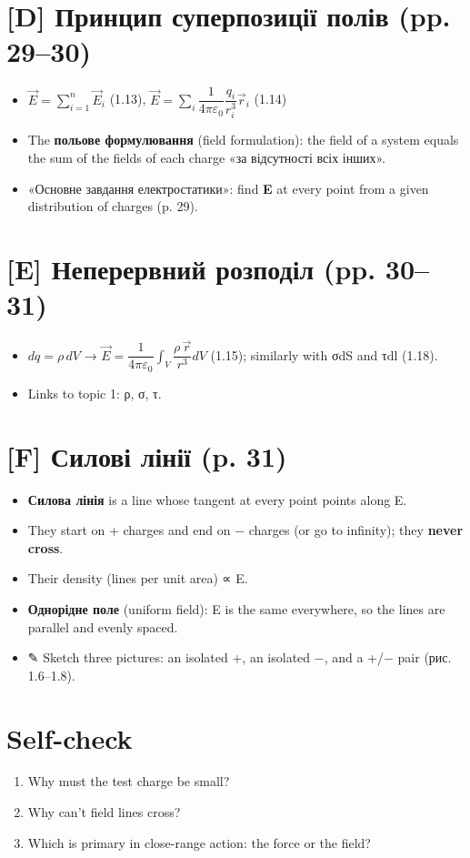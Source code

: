 \documentclass[11pt,a4paper,oneside]{book}
\newcommand{\pen}{{\sffamily\color{accent}✎}}
\begin{document}
\section*{[D] Принцип суперпозиції полів (pp. 29–30)}
\begin{itemize}
\item $\vec E = \sum_{i=1}^n \vec E_i$ (1.13), $\vec E = \sum_i \dfrac{1}{4\pi\varepsilon_0}\dfrac{q_i}{r_i^3}\vec r_i$ (1.14)
\item The \textbf{польове формулювання} (field formulation): the field of a system equals the sum of the fields of each charge «за відсутності всіх інших».
\item «Основне завдання електростатики»: find \textbf{E} at every point from a given distribution of charges (p. 29).
\end{itemize}

\section*{[E] Неперервний розподіл (pp. 30–31)}
\begin{itemize}
\item $dq = \rho\,dV$ → $\vec E = \dfrac{1}{4\pi\varepsilon_0}\int_V \dfrac{\rho\,\vec r}{r^3}dV$ (1.15); similarly with σdS and τdl (1.18).
\item Links to topic 1: ρ, σ, τ.
\end{itemize}

\section*{[F] Силові лінії (p. 31)}
\begin{itemize}
\item \textbf{Силова лінія} is a line whose tangent at every point points along E.
\item They start on + charges and end on − charges (or go to infinity); they \textbf{never cross}.
\item Their density (lines per unit area) ∝ E.
\item \textbf{Однорідне поле} (uniform field): E is the same everywhere, so the lines are parallel and evenly spaced.
\item \pen{} Sketch three pictures: an isolated +, an isolated −, and a +/− pair (рис. 1.6–1.8).
\end{itemize}

\section*{Self-check}
\begin{enumerate}
\item Why must the test charge be small?
\item Why can't field lines cross?
\item Which is primary in close-range action: the force or the field?
\end{enumerate}
\end{document}
